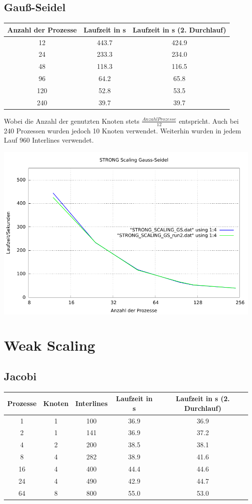 \documentclass[a4paper]{article}
\begin{document}
\subsection{Gauß-Seidel}
\begin{tabular}{|c|c|c|}
\hline 
Anzahl der Prozesse & Laufzeit in s & Laufzeit in s (2. Durchlauf) \\ 
\hline 
12 & 443.7 & 424.9 \\ 
\hline 
24 & 233.3 & 234.0 \\ 
\hline 
48 & 118.3 & 116.5 \\ 
\hline 
96 & 64.2 & 65.8 \\ 
\hline 
120 & 52.8 & 53.5 \\ 
\hline 
240 & 39.7 & 39.7 \\ 
\hline
\end{tabular} 

Wobei die Anzahl der genutzten Knoten stets $\frac{Anzahl Prozesse}{12}$ entspricht. Auch bei 240 Prozessen wurden jedoch 10 Knoten verwendet. Weiterhin wurden in jedem Lauf 960 Interlines verwendet.

\includegraphics[scale=0.8]{img/STRONG_SCALING_GS_laufzeit.pdf}

\section{Weak Scaling}
\subsection{Jacobi}
\begin{tabular}{|c|c|c|c|c|}
\hline 
Prozesse & Knoten & Interlines & Laufzeit in s & Laufzeit in s (2. Durchlauf) \\ 
\hline 
1 & 1 & 100 & 36.9 & 36.9 \\ 
\hline 
2 & 1 & 141 & 36.9 & 37.2 \\ 
\hline 
4 & 2 & 200 & 38.5 & 38.1 \\ 
\hline 
8 & 4 & 282 & 38.9 & 41.6 \\ 
\hline 
16 & 4 & 400 & 44.4 & 44.6 \\ 
\hline 
24 & 4 & 490 & 42.9 & 44.7 \\ 
\hline 
64 & 8 & 800 & 55.0 & 53.0 \\ 
\hline 
\end{tabular} 
\end{document}
